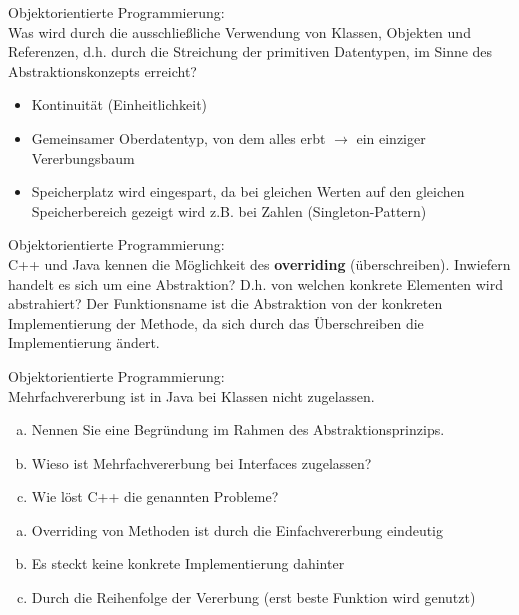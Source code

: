 \begin{card}
	Objektorientierte Programmierung:\\
	Was wird durch die ausschließliche Verwendung von Klassen, Objekten und Referenzen, d.h. durch die Streichung der primitiven Datentypen, im Sinne des Abstraktionskonzepts erreicht?
	\hr
	\begin{itemize}
	\item Kontinuität (Einheitlichkeit)
	\item Gemeinsamer Oberdatentyp, von dem alles erbt $\rightarrow$ ein einziger Vererbungsbaum
  \item Speicherplatz wird eingespart, da bei gleichen Werten auf den gleichen Speicherbereich gezeigt wird z.B. bei Zahlen (Singleton-Pattern)
	\end{itemize}
\end{card}

\begin{card}
	Objektorientierte Programmierung:\\
	C++ und Java kennen die Möglichkeit des \textbf{overriding} (überschreiben). Inwiefern handelt es sich um eine Abstraktion? D.h. von welchen konkrete Elementen wird abstrahiert?
	\hr
	Der Funktionsname ist die Abstraktion von der konkreten Implementierung der Methode, da sich durch das Überschreiben die Implementierung ändert.
\end{card}

\begin{card}
	Objektorientierte Programmierung:\\
	Mehrfachvererbung ist in Java bei Klassen nicht zugelassen.
	\begin{enumerate}[a)]
	\item Nennen Sie eine Begründung im Rahmen des Abstraktionsprinzips.
	\item Wieso ist Mehrfachvererbung bei Interfaces zugelassen?
	\item Wie löst C++ die genannten Probleme?
	\end{enumerate}
	\hr
	\begin{enumerate}[a)]
	\item Overriding von Methoden ist durch die Einfachvererbung eindeutig
	\item Es steckt keine konkrete Implementierung dahinter
	\item Durch die Reihenfolge der Vererbung (erst beste Funktion wird genutzt)
	\end{enumerate}
\end{card}

